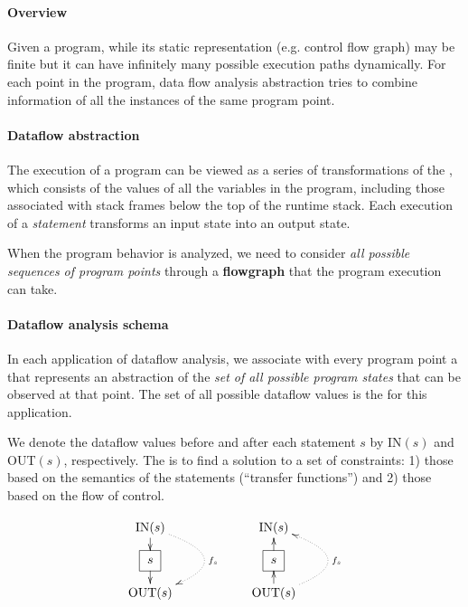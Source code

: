 \documentclass{memo}
\begin{document}
\small
{}

\paragraph{Overview}
Given a program, while its static representation (e.g. control flow graph) may
be finite but it can have infinitely many possible execution paths
dynamically. 
For each point in the program, data flow analysis abstraction tries to combine
information of all the instances of the same program point. 


\paragraph{Dataflow abstraction}
The execution of a program can be viewed as a series of transformations of the
, which consists of the values of all the variables in the
program, including those associated with stack frames below the top of the
runtime stack. 
Each execution of a {\em statement\/} transforms an input state into an output
state. 

When the program behavior is analyzed, we need to consider {\em all possible
sequences of program points\/} through a {\bf flowgraph\/} that the program 
execution can take.

\paragraph{Dataflow analysis schema}
In each application of dataflow analysis, we associate with every program
point a  that represents an abstraction of the {\em set of
  all possible program states\/} that can be observed at that point. 
The set of all possible dataflow values is the  for this
application. 

We denote the dataflow values before and after each statement $s$ by IN$(s)$
and OUT$(s)$, respectively. The  is to find a solution to
a set of constraints: 1) those based on the semantics of the statements
(``transfer functions'') and 2) those based on the flow of control.

\[ \xymatrix@-0.5cm{
    \mbox{IN}(s) \ar[d] \ar@{.>}@/^10ex/[dd]^{f_s} &&&&
    \mbox{IN}(s)  \\
      *++[F]{s} \ar[d]  &&&& 
      *++[F]{s} \ar[u]  \\ 
    \mbox{OUT}(s) &&&& 
    \mbox{OUT}(s) \ar[u]\ar@{.>}@/_10ex/[uu]_{f_s} 
}\]
\end{document}
